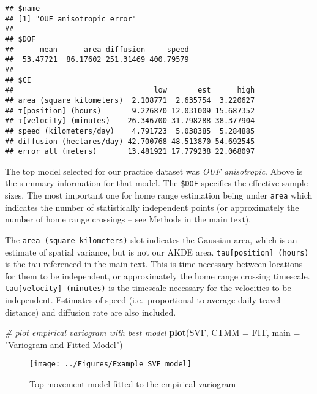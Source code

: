 \documentclass[
]{article}
\newenvironment{Shaded}{\begin{snugshade}}{\end{snugshade}}
\newcommand{\AttributeTok}[1]{\textcolor[rgb]{0.13,0.29,0.53}{#1}}
\newcommand{\CommentTok}[1]{\textcolor[rgb]{0.56,0.35,0.01}{\textit{#1}}}
\newcommand{\FunctionTok}[1]{\textcolor[rgb]{0.13,0.29,0.53}{\textbf{#1}}}
\newcommand{\NormalTok}[1]{#1}
\newcommand{\StringTok}[1]{\textcolor[rgb]{0.31,0.60,0.02}{#1}}
\begin{document}
\begin{verbatim}
## $name
## [1] "OUF anisotropic error"
## 
## $DOF
##      mean      area diffusion     speed 
##  53.47721  86.17602 251.31469 400.79579 
## 
## $CI
##                                low       est      high
## area (square kilometers)  2.108771  2.635754  3.220627
## τ[position] (hours)       9.226870 12.031009 15.687352
## τ[velocity] (minutes)    26.346700 31.798288 38.377904
## speed (kilometers/day)    4.791723  5.038385  5.284885
## diffusion (hectares/day) 42.700768 48.513870 54.692545
## error all (meters)       13.481921 17.779238 22.068097
\end{verbatim}

The top model selected for our practice dataset was \emph{OUF
anisotropic}. Above is the summary information for that model. The
\texttt{\$DOF} specifies the effective sample sizes. The most important
one for home range estimation being under \texttt{area} which indicates
the number of statistically independent points (or approximately the
number of home range crossings -- see Methods in the main text).

The \texttt{area\ (square\ kilometers)} slot indicates the Gaussian
area, which is an estimate of spatial variance, but is not our AKDE
area. \texttt{tau{[}position{]}\ (hours)} is the tau referenced in the
main text. This is time necessary between locations for them to be
independent, or approximately the home range crossing timescale.
\texttt{tau{[}velocity{]}\ (minutes)} is the timescale necessary for the
velocities to be independent. Estimates of speed (i.e.~proportional to
average daily travel distance) and diffusion rate are also included.

\begin{Shaded}
\begin{Highlighting}[]
\CommentTok{\# plot empirical variogram with best model}
\FunctionTok{plot}\NormalTok{(SVF, }\AttributeTok{CTMM =}\NormalTok{ FIT, }\AttributeTok{main =} \StringTok{"Variogram and Fitted Model"}\NormalTok{)}
\end{Highlighting}
\end{Shaded}

\begin{figure}[H]

{\centering \texttt{[image: ../Figures/Example\_SVF\_model]} 

}

\caption{Top movement model fitted to the empirical variogram}\label{fig:unnamed-chunk-21}
\end{figure}
\end{document}
